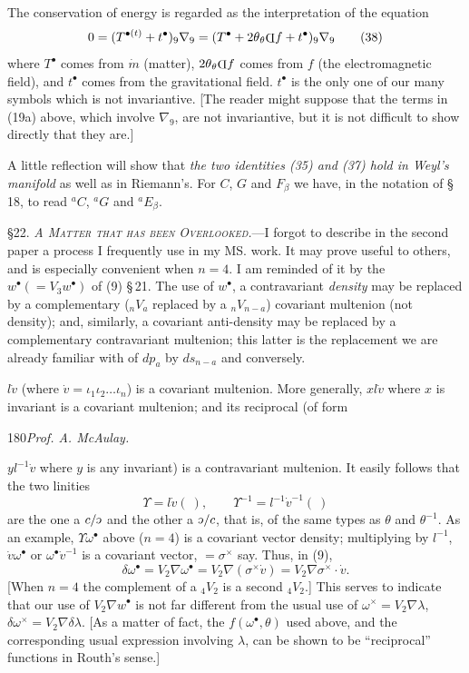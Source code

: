 \documentclass[11pt]{article}
\newcommand{\invc}{\mathord{\rotatebox[origin=c]{180}{$c$}}}
\newcommand{\invc}{\mathord{\text{\invcfont ɔ}}}
\newcommand{\invd}{\mathord{\vcenter{\hbox{\rotatebox[origin=c]{180}{\(\mathrm{D}\)}}}}}
\newcommand{\thetaPi}{{}_\theta\invd}
\begin{document}
\indent The conservation of energy is regarded as the interpretation of the equation
\[
  0=(T^{\bullet(t)}+t^\bullet)_9\nabla_9=(T^\bullet+2\theta\thetaPi f+t^\bullet)_9\nabla_9
  \tag{38}
\]
where $T^\bullet$ comes from $\dot m$ (matter), $2\theta\thetaPi f$ comes from $f$ (the electromagnetic field), and $t^\bullet$ comes from the gravitational field. $t^\bullet$ is the only one of our many symbols which is not invariantive. [The reader might suppose that the terms in (19a) above, which involve $\nabla_9$, are not invariantive, but it is not difficult to show directly that they are.]

\indent A little reflection will show that \emph{the two identities (35) and (37) hold in Weyl's manifold} as well as in Riemann's. For $C$, $G$ and $F_\beta$ we have, in the notation of \S\,18, to read ${}^aC$, ${}^aG$ and ${}^aE_\beta$.

\indent \textsc{\S 22. \emph{A Matter that has been Overlooked.}}---I forgot to describe in the second paper a process I frequently use in my MS. work. It may prove useful to others, and is especially convenient when $n=4$. I am reminded of it by the $w^\bullet(=V_3w^\bullet)$ of (9) \S\,21. The use of $w^\bullet$, a contravariant \emph{density} may be replaced by a complementary (${}_nV_a$ replaced by a ${}_nV_{n-a}$) covariant multenion (not density); and, similarly, a covariant anti-density may be replaced by a complementary contravariant multenion; this latter is the replacement we are already familiar with of $d p_a$ by $d s_{n-a}$ and conversely.

\indent $l\dot v$ (where $\dot v=\iota_1\iota_2\ldots\iota_n$) is a covariant multenion. More generally, $xl\dot v$ where $x$ is invariant is a covariant multenion; and its reciprocal (of form

\newpage\thispagestyle{empty}\begin{center}180\hfill \textit{Prof. A. McAulay.}\end{center}
$yl^{-1}\dot v$ where $y$ is any invariant) is a contravariant multenion. It easily follows that the two linities
\[
  \Upsilon=l\dot v(\ ),\qquad \Upsilon^{-1}=l^{-1}\dot v^{-1}(\ )
  \tag{1}
\]
are the one a $c/\invc$ and the other a $\invc/c$, that is, of the same types as $\theta$ and $\theta^{-1}$. As an example, $\Upsilon\omega^\bullet$ above ($n=4$) is a covariant vector density; multiplying by $l^{-1}$, $\dot v\omega^\bullet$ or $\omega^\bullet\dot v^{-1}$ is a covariant vector, $=\sigma^\times$ say. Thus, in (9),
\[
  \delta\omega^\bullet=V_2\nabla\omega^\bullet=V_2\nabla(\sigma^\times\dot v)=V_2\nabla\sigma^\times\mathbin{\cdot}\dot v.
\]
[When $n=4$ the complement of a ${}_4V_2$ is a second ${}_4V_2$.] This serves to indicate that our use of $V_2\nabla w^\bullet$ is not far different from the usual use of $\omega^\times=V_2\nabla\lambda$, $\delta\omega^\times=V_2\nabla\delta\lambda$. [As a matter of fact, the $f(\omega^\bullet,\theta)$ used above, and the corresponding usual expression involving $\lambda$, can be shown to be ``reciprocal'' functions in Routh's sense.]
\end{document}
